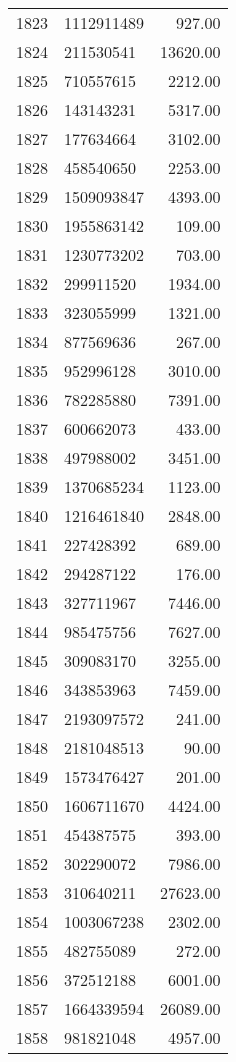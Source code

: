 \begin{table}[ht]
\begin{tabular}{rlr}
  1823 & 1112911489 & 927.00 \\ 
  1824 & 211530541 & 13620.00 \\ 
  1825 & 710557615 & 2212.00 \\ 
  1826 & 143143231 & 5317.00 \\ 
  1827 & 177634664 & 3102.00 \\ 
  1828 & 458540650 & 2253.00 \\ 
  1829 & 1509093847 & 4393.00 \\ 
  1830 & 1955863142 & 109.00 \\ 
  1831 & 1230773202 & 703.00 \\ 
  1832 & 299911520 & 1934.00 \\ 
  1833 & 323055999 & 1321.00 \\ 
  1834 & 877569636 & 267.00 \\ 
  1835 & 952996128 & 3010.00 \\ 
  1836 & 782285880 & 7391.00 \\ 
  1837 & 600662073 & 433.00 \\ 
  1838 & 497988002 & 3451.00 \\ 
  1839 & 1370685234 & 1123.00 \\ 
  1840 & 1216461840 & 2848.00 \\ 
  1841 & 227428392 & 689.00 \\ 
  1842 & 294287122 & 176.00 \\ 
  1843 & 327711967 & 7446.00 \\ 
  1844 & 985475756 & 7627.00 \\ 
  1845 & 309083170 & 3255.00 \\ 
  1846 & 343853963 & 7459.00 \\ 
  1847 & 2193097572 & 241.00 \\ 
  1848 & 2181048513 & 90.00 \\ 
  1849 & 1573476427 & 201.00 \\ 
  1850 & 1606711670 & 4424.00 \\ 
  1851 & 454387575 & 393.00 \\ 
  1852 & 302290072 & 7986.00 \\ 
  1853 & 310640211 & 27623.00 \\ 
  1854 & 1003067238 & 2302.00 \\ 
  1855 & 482755089 & 272.00 \\ 
  1856 & 372512188 & 6001.00 \\ 
  1857 & 1664339594 & 26089.00 \\ 
  1858 & 981821048 & 4957.00 \\ 

\end{tabular}
\end{table}
